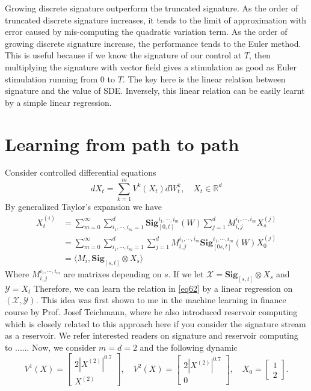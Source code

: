 \documentclass[12pt]{report}
\theoremstyle{definition}
\theoremstyle{remark}
\newcommand{\R}{\mathbb{R}}
\begin{document}
Growing discrete signature outperform the truncated signature. As the order of truncated discrete signature increases, it tends to the limit of approximation with error caused by mis-computing the quadratic variation term. As the order of growing discrete signature increase, the performance tends to the Euler method. This is useful because if we know the signature of our control at $T$, then multiplying the signature with vector field gives a stimulation as good as Euler stimulation running from $0$ to $T$. The key here is the linear relation between signature and the value of SDE. Inversely, this linear relation can be easily learnt by a simple linear regression.

\section{Learning from path to path}
Consider controlled differential equations 
\begin{equation}
  dX_{t} = \sum_{k=1}^{m}V^{k}(X_{t})dW^{k}_{t},\quad X_{t}\in\R^{d}
\end{equation}
By generalized Taylor's expansion we have 
\begin{equation}\label{eq62}
    \begin{split}
        X^{(i)}_{t} &= \sum_{m=0}^{\infty}\sum_{i_{1},\cdots,i_{m} = 1}^{d}\mathbf{Sig}_{[0,t]}^{i_{1},\cdots,i_{m}}(W)\sum_{j=1}^{d}M^{i_{1},\cdots,i_{m}}_{i,j}X^{(j)}_{s}\\
        &= \sum_{m=0}^{\infty}\sum_{i_{1},\cdots,i_{m} = 1}^{d}\sum_{j=1}^{d}M^{i_{1},\cdots,i_{m}}_{i,j} \mathbf{Sig}_{[0s,t]}^{i_{1},\cdots,i_{m}}(W) X^{(j)}_{0}\\
        &= \langle M_{i} ,  \mathbf{Sig}_{[s,t]} \otimes X_{s} \rangle
    \end{split}
\end{equation}
Where $M^{i_{1},\cdots,i_{m}}_{i,j}$ are matrixes depending on $s$. If we let $\mathcal{X} = \mathbf{Sig}_{[s,t]} \otimes X_{s}$ and $\mathcal{Y} = X_{t}$
Therefore, we can learn the relation in \eqref{eq62} by a linear regression on $(\mathcal{X},\mathcal{Y})$. This idea was first shown to me in the machine learning in finance course by Prof. Josef Teichmann, where he also introduced reservoir computing which is closely related to this approach here if you consider the signature stream as a reservoir. We refer interested readers on signature and reservoir computing to ......  Now, we consider $m = d = 2$ and the following dynamic
\begin{equation*}
  V^{1}(X) = \begin{bmatrix}
    2|X^{(2)}|^{0.7}\\
    X^{(2)}
  \end{bmatrix},\quad 
  V^{2}(X) = \begin{bmatrix}
    2|X^{(2)}|^{0.7}\\
    0
  \end{bmatrix},\quad 
  X_{0} = \begin{bmatrix}
    1\\
    2
  \end{bmatrix}.
\end{equation*}
\end{document}
